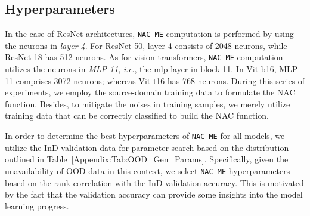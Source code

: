 \documentclass{article} \usepackage{iclr2024_conference,times}
\newcommand{\ie}{\textit{i}.\textit{e}.}
\begin{document}
\subsection{Hyperparameters}
In the case of ResNet architectures, \texttt{NAC-ME} computation is performed by using the neurons in \textit{layer-4}. For ResNet-50, layer-4 consists of 2048 neurons, while ResNet-18 has 512 neurons.
As for vision transformers, \texttt{NAC-ME} computation utilizes the neurons in \textit{MLP-11}, \ie, the mlp layer in block 11. 
In Vit-b16, MLP-11 comprises 3072 neurons; whereas Vit-t16 has 768 neurons. 
During this series of experiments, we employ the source-domain training data to formulate the NAC function.
Besides, to mitigate the noises in training samples, we merely utilize training data that can be correctly classified to build the NAC function.


In order to determine the best hyperparameters of \texttt{NAC-ME} for all models, we utilize the InD validation data for parameter search based on the distribution outlined in Table~\ref{Appendix:Tab:OOD_Gen_Params}. 
Specifically, given the unavailability of OOD data in this context, we select \texttt{NAC-ME} hyperparameters  based on the rank correlation with the InD validation accuracy. This is motivated by the fact that the validation accuracy can provide some insights into the model learning progress.














\vspace{5mm}
\begin{table*}[!hb]
	\centering
	\caption{Hyperparameters of our \texttt{NAC-ME} and their distributions for random search. Note that  can be computed based on , as illustrated in Appendix~\ref{Sec:Appendix:Approx}}
	\label{Appendix:Tab:OOD_Gen_Params}
\end{table*}
\end{document}
